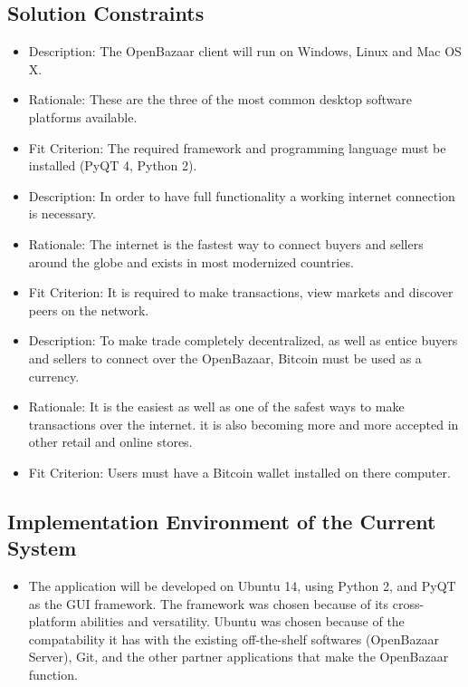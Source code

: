\documentclass{article}
\begin{document}
\subsection{Solution Constraints}
\begin{itemize}

\item
Description: The OpenBazaar client will run on Windows, Linux and Mac OS X. 

\item
Rationale: These are the three of the most common desktop software platforms available. 

\item
Fit Criterion: The required framework and programming language must be installed (PyQT 4, Python 2).

\item
Description: In order to have full functionality a working internet connection is necessary.

\item
Rationale: The internet is the fastest way to connect buyers and sellers around the globe and exists in most modernized countries.

\item
Fit Criterion: It is required to make transactions, view markets and discover peers on the network.

\item
Description: To make trade completely decentralized, as well as entice buyers and sellers to connect over the OpenBazaar, Bitcoin must be used as a currency. 

\item
Rationale: It is the easiest as well as one of the safest ways to make transactions over the internet. it is also becoming more and more accepted in other retail and online stores. 

\item
Fit Criterion: Users must have a Bitcoin wallet installed on there computer. 

\end{itemize}

\subsection{Implementation Environment of the Current System}

\begin{itemize}
\item
The application will be developed on Ubuntu 14, using Python 2, and PyQT as the GUI framework. The framework was chosen because of its cross-platform abilities and versatility. Ubuntu was chosen because of the compatability it has with the existing off-the-shelf softwares (OpenBazaar Server), Git, and the other partner applications that make the OpenBazaar function. 
\end{itemize}
\end{document}
